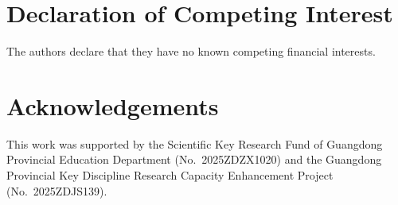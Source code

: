\documentclass[review]{elsarticle}
\begin{document}
\section*{Declaration of Competing Interest}
The authors declare that they have no known competing financial interests.

\section*{Acknowledgements}
This work was supported by the Scientific Key Research Fund of Guangdong Provincial Education Department (No.~2025ZDZX1020) and the Guangdong Provincial Key Discipline Research Capacity Enhancement Project (No.~2025ZDJS139).


\end{document}
